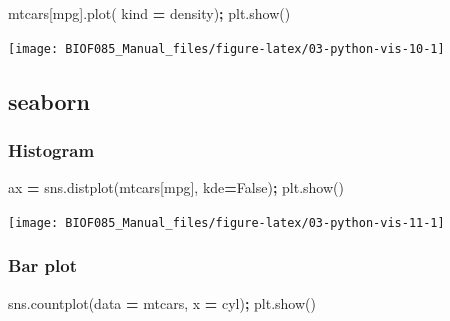\documentclass[
  letterpaper,
]{scrbook}
\newenvironment{Shaded}{\begin{snugshade}}{\end{snugshade}}
\newcommand{\NormalTok}[1]{#1}
\newcommand{\OperatorTok}[1]{\textcolor[rgb]{0.81,0.36,0.00}{\textbf{#1}}}
\newcommand{\StringTok}[1]{\textcolor[rgb]{0.31,0.60,0.02}{#1}}
\newcommand{\VariableTok}[1]{\textcolor[rgb]{0.00,0.00,0.00}{#1}}
\begin{document}
\begin{Shaded}
\begin{Highlighting}[]
\NormalTok{mtcars[}\StringTok{\textquotesingle{}mpg\textquotesingle{}}\NormalTok{].plot( kind }\OperatorTok{=} \StringTok{\textquotesingle{}density\textquotesingle{}}\NormalTok{)}\OperatorTok{;}
\NormalTok{plt.show()}
\end{Highlighting}
\end{Shaded}

\begin{center}\texttt{[image: BIOF085\_Manual\_files/figure-latex/03-python-vis-10-1]} \end{center}

\hypertarget{seaborn}{%
\subsection{seaborn}\label{seaborn}}

\hypertarget{histogram-1}{%
\subsubsection{Histogram}\label{histogram-1}}

\begin{Shaded}
\begin{Highlighting}[]
\NormalTok{ax }\OperatorTok{=}\NormalTok{ sns.distplot(mtcars[}\StringTok{\textquotesingle{}mpg\textquotesingle{}}\NormalTok{], kde}\OperatorTok{=}\VariableTok{False}\NormalTok{)}\OperatorTok{;}
\NormalTok{plt.show()}
\end{Highlighting}
\end{Shaded}

\begin{center}\texttt{[image: BIOF085\_Manual\_files/figure-latex/03-python-vis-11-1]} \end{center}

\hypertarget{bar-plot-1}{%
\subsubsection{Bar plot}\label{bar-plot-1}}

\begin{Shaded}
\begin{Highlighting}[]
\NormalTok{sns.countplot(data }\OperatorTok{=}\NormalTok{ mtcars, x }\OperatorTok{=} \StringTok{\textquotesingle{}cyl\textquotesingle{}}\NormalTok{)}\OperatorTok{;}
\NormalTok{plt.show()}
\end{Highlighting}
\end{Shaded}
\end{document}
